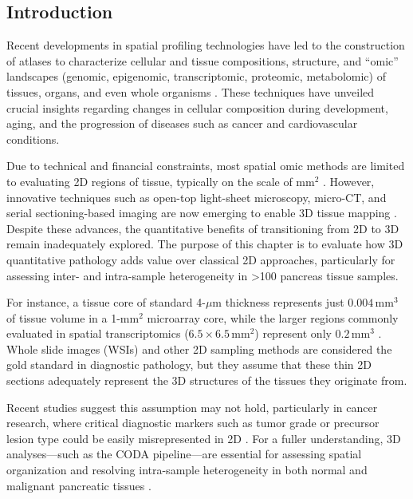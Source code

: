 \begin{refsection}
    
    
    \section{Introduction}
    Recent developments in spatial profiling technologies have led to the construction of atlases to characterize cellular and tissue compositions, structure, and “omic” landscapes (genomic, epigenomic, transcriptomic, proteomic, metabolomic) of tissues, organs, and even whole organisms \cite{Liu2020High,Ozsolak2011RNA}. These techniques have unveiled crucial insights regarding changes in cellular composition during development, aging, and the progression of diseases such as cancer and cardiovascular conditions. 

    Due to technical and financial constraints, most spatial omic methods are limited to evaluating 2D regions of tissue, typically on the scale of \( \text{mm}^2 \) \cite{ref10, ref14}. However, innovative techniques such as open-top light-sheet microscopy, micro-CT, and serial sectioning-based imaging are now emerging to enable 3D tissue mapping \cite{ref15, ref18}. Despite these advances, the quantitative benefits of transitioning from 2D to 3D remain inadequately explored. The purpose of this chapter is to evaluate how 3D quantitative pathology adds value over classical 2D approaches, particularly for assessing inter- and intra-sample heterogeneity in >100 pancreas tissue samples.

    For instance, a tissue core of standard 4-\( \mu \text{m} \) thickness represents just \( 0.004 \, \text{mm}^3 \) of tissue volume in a 1-\( \text{mm}^2 \) microarray core, while the larger regions commonly evaluated in spatial transcriptomics (\( 6.5 \times 6.5 \, \text{mm}^2 \)) represent only \( 0.2 \, \text{mm}^3 \) \cite{ref13}. Whole slide images (WSIs) and other 2D sampling methods are considered the gold standard in diagnostic pathology, but they assume that these thin 2D sections adequately represent the 3D structures of the tissues they originate from.

    Recent studies suggest this assumption may not hold, particularly in cancer research, where critical diagnostic markers such as tumor grade or precursor lesion type could be easily misrepresented in 2D \cite{ref21, ref25}. For a fuller understanding, 3D analyses—such as the CODA pipeline—are essential for assessing spatial organization and resolving intra-sample heterogeneity in both normal and malignant pancreatic tissues \cite{ref28}.


\end{refsection}
